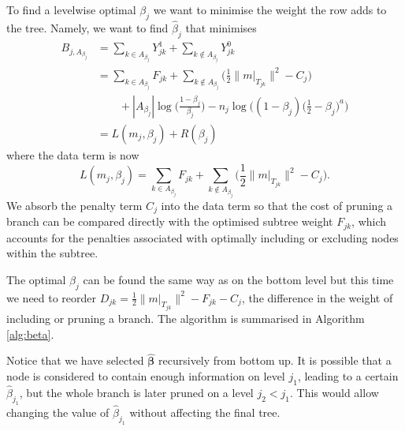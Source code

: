 \documentclass[11pt,a4paper]{article}
\begin{document}
To find a levelwise optimal $\beta_j$ we want to minimise the weight the row adds to the tree. Namely, we want to find $\hat{\beta}_j$ that minimises
\begin{align*}
B_{j,A_{\beta_j}}
& = \sum_{k\in A_{\beta_j}} Y^1_{jk}
+\sum_{k\notin A_{\beta_j}} Y^0_{jk}\\
& = \sum_{k\in A_{\beta_j}}F_{jk} 
+ \sum_{k\notin A_{\beta_j}}\Big(\frac{1}{2}\|m|_{T_{jk}}\|^2-C_j\Big)\\
& \quad\quad +|A_{\beta_j}|\log\Big(\frac{1-\beta_j}{\beta_j}\Big)
-n_j\log\bigg((1-\beta_j)\Big(\frac{1}{2}-\beta_j\Big)^a\bigg)\\
& = L(m_j,\beta_j)+R(\beta_j)
\end{align*}
where the data term is now 
$$L(m_j,\beta_j)= \sum_{k\in A_{\beta_j}}F_{jk} 
+ \sum_{k\notin A_{\beta_j}}\Big(\frac{1}{2}\|m|_{T_{jk}}\|^2-C_j\Big).$$
We absorb the penalty term $C_j$ into the data term so that the cost of pruning a branch can be compared directly with the optimised subtree weight $F_{jk}$, which accounts for the penalties associated with optimally including or excluding nodes within the subtree.

The optimal $\beta_j$ can be found the same way as on the bottom level but this time we need to reorder $D_{jk}=\frac{1}{2}\|m|_{T_{jk}}\|^2-F_{jk}-C_j$, the difference in the weight of including or pruning a branch. The algorithm is summarised in Algorithm \ref{alg:beta}. 

Notice that we have selected $\hat{\boldsymbol{\beta}}$ recursively from bottom up. It is possible that a node is considered to contain enough information on level $j_1$, leading to a certain $\hat{\beta}_{j_1}$, but the whole branch is later pruned on a level $j_2<j_1$. This would allow changing the value of $\hat{\beta}_{j_1}$ without affecting the final tree.
\end{document}
